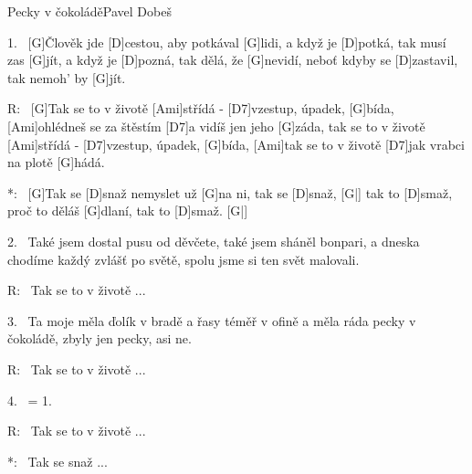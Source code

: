 \begin{song}{Pecky v čokoládě}{Pavel Dobeš}

\begin{xverse}{1.~}
[\large G]{Čl}ověk jde [\large D]cestou, aby potkával [\large G]lidi,
a když je [\large D]potká, tak musí zas [\large G]jít,
a když je [\large D]pozná, tak dělá, že [\large G]nevidí,
neboť kdyby se [\large D]zastavil, tak nemoh' by [\large G]jít.
\end{xverse}

\begin{xverse}{R:~}
[\large G]Tak se to v životě [\large Ami]střídá - [\large D7]vzestup, úpadek, [\large G]bída,
[\large Ami]ohlédneš se za štěstím [\large D7]a vidíš jen jeho [\large G]záda,
tak se to v životě [\large Ami]střídá - [\large D7]vzestup, úpadek, [\large G]bída,
[\large Ami]tak se to v životě [\large D7]jak vrabci na plotě [\large G]hádá.
\end{xverse}

\begin{xverse}{*:~}
[\large G]Tak se [\large D]snaž nemyslet už [\large G]na ni, tak se [\large D]snaž, [\large G|]{}
tak to [\large D]smaž, proč to děláš [\large G]dlaní, tak to [\large D]smaž. [\large G|]{}
\end{xverse}

\begin{xverse}{2.~}
Také jsem dostal pusu od děvčete,
také jsem sháněl bonpari,
a dneska chodíme každý zvlášť po světě,
spolu jsme si ten svět malovali.
\end{xverse}

\begin{xverse}{R:~}
Tak se to v životě ...
\end{xverse}

\begin{xverse}{3.~}
Ta moje měla ďolík v bradě
a řasy téměř v ofině
a měla ráda pecky v čokoládě,
zbyly jen pecky, asi ne.
\end{xverse}

\begin{xverse}{R:~}
Tak se to v životě ...
\end{xverse}

\begin{xverse}{4.~}
= 1.
\end{xverse}

\begin{xverse}{R:~}
Tak se to v životě ...
\end{xverse}

\begin{xverse}{*:~}
Tak se snaž ...
\end{xverse}

\end{song}




